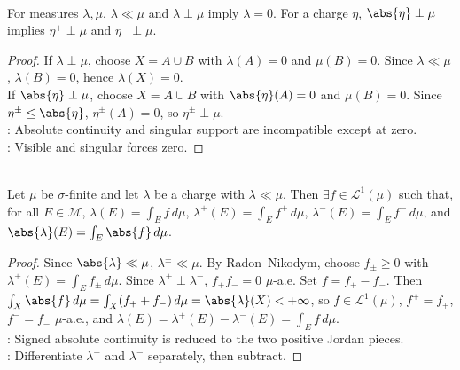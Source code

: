 \begin{corollary} \label{cor:absolute-continuous-singular-zero-measure} \\
For measures $\lambda,\mu$, $\lambda\ll\mu$ and $\lambda\perp\mu$ imply $\lambda=0$. For a charge $\eta$, $\abs{\eta}\perp\mu$ implies $\eta^+\perp\mu$ and $\eta^-\perp\mu$.
\begin{proof}
If $\lambda\perp\mu$, choose $X=A\cup B$ with $\lambda(A)=0$ and $\mu(B)=0$. Since $\lambda\ll\mu$, $\lambda(B)=0$, hence $\lambda(X)=0$.\\
If $\abs{\eta}\perp\mu$, choose $X=A\cup B$ with $\abs{\eta}(A)=0$ and $\mu(B)=0$. Since $\eta^\pm\leq\abs{\eta}$, $\eta^\pm(A)=0$, so $\eta^\pm\perp\mu$.\\
: Absolute continuity and singular support are incompatible except at zero.\\
: Visible and singular forces zero.
\end{proof}
\end{corollary}

\begin{corollary} \label{cor:radon-nikodym-for-charges} \\
Let $\mu$ be $\sigma$-finite and let $\lambda$ be a charge with $\lambda\ll\mu$. Then $\exists f\in\mathscr{L}^1(\mu)$ such that, for all $E\in\mathcal{M}$, $\lambda(E)=\int_E f\,d\mu$, $\lambda^+(E)=\int_E f^+\,d\mu$, $\lambda^-(E)=\int_E f^-\,d\mu$, and $\abs{\lambda}(E)=\int_E\abs{f}\,d\mu$.
\begin{proof}
Since $\abs{\lambda}\ll\mu$, $\lambda^\pm\ll\mu$. By Radon--Nikodym, choose $f_\pm\geq0$ with $\lambda^\pm(E)=\int_Ef_\pm\,d\mu$. Since $\lambda^+\perp\lambda^-$, $f_+f_-=0$ $\mu$-a.e. Set $f=f_+-f_-$. Then $\int_X\abs{f}\,d\mu=\int_X(f_++f_-)\,d\mu=\abs{\lambda}(X)<+\infty$, so $f\in\mathscr{L}^1(\mu)$, $f^+=f_+$, $f^-=f_-$ $\mu$-a.e., and $\lambda(E)=\lambda^+(E)-\lambda^-(E)=\int_Ef\,d\mu$.\\
: Signed absolute continuity is reduced to the two positive Jordan pieces.\\
: Differentiate $\lambda^+$ and $\lambda^-$ separately, then subtract.
\end{proof}
\end{corollary}

